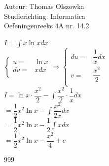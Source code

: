 \documentclass[a4paper]{article}
\newcommand{\dint}{\displaystyle\int}
\begin{document}
\noindent \large Auteur: Thomas Olszowka \\
\noindent \large Studierichting: Informatica \\
\noindent \large Oefeningenreeks 4A nr. 14.2  \\



\medskip

\normalsize

$I = \dint x \ln x dx$ \\

$\left\{\begin{array}{cc}
    u =& \ln x \\ 
    dv =& xdx  \\
\end{array}\right. \Rightarrow\left\{\begin{array}{cc}
    du =& \dfrac{1}{x} dx \\
    v =& \dfrac{x^2}{2}  \\
\end{array}\right.$ \\

$I = \ln x \cdot \dfrac{x^2}{2} - \dint \dfrac{x^2}{2} \cdot \dfrac{1}{x} dx$ \\

$= \dfrac{1}{2}x^2 \ln x - \dint \dfrac{x^2}{2x} dx$ \\

$= \dfrac{1}{2}x^2 \ln x - \dfrac{1}{2} \dint x dx$ \\

$= \dfrac{1}{2}x^2 \ln x - \dfrac{x^2}{4} + c$ \\

\begin{thebibliography}{999}
\end{thebibliography}
\end{document}
